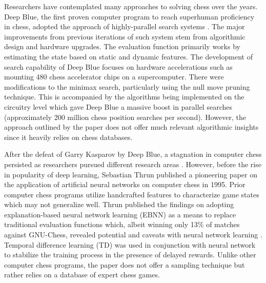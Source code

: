 \documentclass[letterpaper]{article} %
\begin{document}
Researchers have contemplated many approaches to solving chess over the years. Deep Blue, the first proven computer program to reach superhuman proficiency in chess, adopted the approach of highly-parallel search systems \cite{DeepBlue}. The major improvements from previous iterations of such system stem from algorithmic design and hardware upgrades. The evaluation function primarily works by estimating the state based on static and dynamic features. The development of search capability of Deep Blue focuses on hardware accelerations such as mounting 480 chess accelerator chips on a supercomputer. There were modifications to the minimax search, particularly using the null move pruning technique. This is accompanied by the algorithms being implemented on the circuitry level which gave Deep Blue a massive boost in parallel searches (approximately 200 million chess position searches per second). However, the approach outlined by the paper does not offer much relevant algorithmic insights since it heavily relies on chess databases.

After the defeat of Garry Kasparov by Deep Blue, a stagnation in computer chess persisted as researchers pursued different research areas \cite{deepblueshistory}. However, before the rise in popularity of deep learning, Sebastian Thrun published a pioneering paper on the application of artificial neural networks on computer chess in 1995. Prior computer chess programs utilize handcrafted features to characterize game states which may not generalize well. Thrun published the findings on adopting explanation-based neural network learning (EBNN) as a means to replace traditional evaluation functions which, albeit winning only 13\% of matches against GNU-Chess, revealed potential and caveats with neural network learning \cite{thrun}. Temporal difference learning (TD) was used in conjunction with neural network to stabilize the training process in the presence of delayed rewards. Unlike other computer chess programs, the paper does not offer a sampling technique but rather relies on a database of expert chess games.
\end{document}
